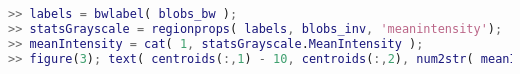 \begin{lstlisting}[language=matlab]
>> labels = bwlabel( blobs_bw );
>> statsGrayscale = regionprops( labels, blobs_inv, 'meanintensity');
>> meanIntensity = cat( 1, statsGrayscale.MeanIntensity );
>> figure(3); text( centroids(:,1) - 10, centroids(:,2), num2str( meanIntensity, 4 ), 'color', 'blue', 'fontsize', 14)

\end{lstlisting}